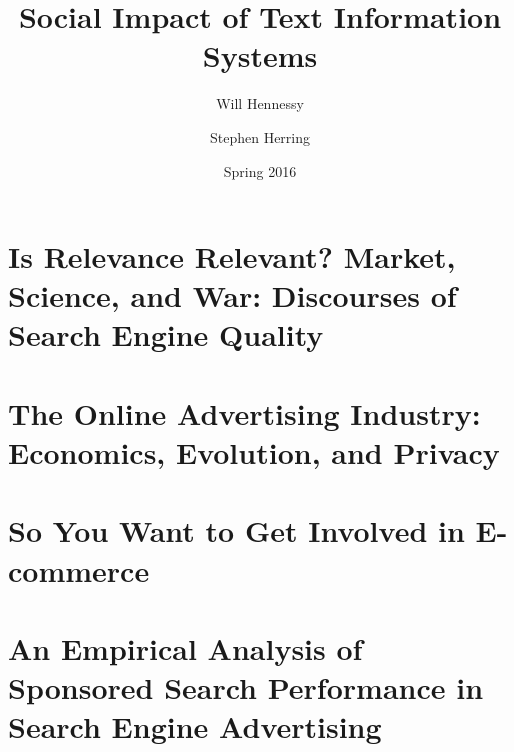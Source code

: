 \documentclass[11pt]{article}
\title{Social Impact of Text Information Systems}
\author{Will Hennessy \and Stephen Herring}
\date{Spring 2016}
\begin{document}
\maketitle


\newpage

%

\section{Is Relevance Relevant? Market, Science, and War:  Discourses of Search Engine Quality}

\newpage

%

\section{The Online Advertising Industry: Economics, Evolution, and Privacy}

\newpage

%

\section{So You Want to Get Involved in E-commerce}

\newpage

%

\section{An Empirical Analysis of Sponsored Search Performance in Search Engine Advertising}

\newpage

%

%
\end{document}
